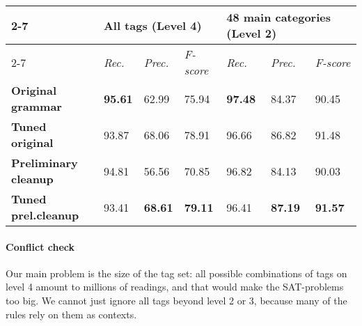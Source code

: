 {{\begin{table*}[t]
\centering
\begin{tabular}{l|l|l|l|l|l|l|}
\cline{2-7}
                                                 & \multicolumn{3}{l|}{\textbf{All tags} (Level 4)}            & \multicolumn{3}{l|}{\textbf{48 main categories} (Level 2)}  \\ \cline{2-7}
                                                 & \textit{Rec.} & \textit{Prec.} & \textit{F-score} & \textit{Rec.} & \textit{Prec.} & \textit{F-score} \\ \hline
\multicolumn{1}{|l|}{\textbf{Original grammar}}
					    & \textbf{95.61}  & 62.99         &  75.94         & \textbf{97.48}  &  84.37           &  90.45           \\ \hline
\multicolumn{1}{|l|}{\textbf{Tuned original}}
					    & 93.87          & 68.06             &  78.91              & 96.66          &  86.82           &  91.48            \\ \hline
\multicolumn{1}{|l|}{\textbf{Preliminary cleanup}}
					   & 94.81           & 56.56             & 70.85               &  96.82         &  84.13           &  90.03           \\ \hline
\multicolumn{1}{|l|}{\textbf{Tuned prel.cleanup}}
					   & 93.41           & \textbf{68.61}  & \textbf{79.11}   &  96.41        &  \textbf{87.19}   &  \textbf{91.57}           \\ \hline
\end{tabular}
\caption{Preliminary evaluation on words, excluding punctuation, for levels 4 and 2 of granularity.}
\label{table:res}
\end{table*}

\paragraph{Conflict check}


Our main problem is the size of the tag set: all possible combinations of tags on level 4 amount to millions of readings,
and that would make the SAT-problems too big.
We cannot just ignore all tags beyond level 2 or 3, because many of the rules rely on them as contexts.

}}
